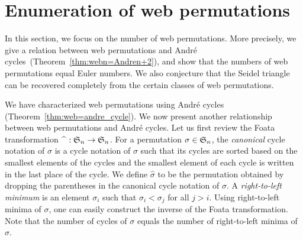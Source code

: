 \section{Enumeration of web permutations}
\label{sec:enumeration}
In this section, we focus on the number of web permutations. 
More precisely, we give a relation between web permutations and
Andr\'e cycles~(Theorem~\ref{thm:webn=Andren+2}),
and show that the numbers of web permutations equal Euler numbers.
We also conjecture that the Seidel triangle can be recovered completely from
the certain classes of web permutations.

We have characterized web permutations using Andr\'e cycles (Theorem~\ref{thm:web=andre_cycle}).
We now present another relationship between web permutations and Andr\'e cycles.
Let us first review the Foata transformation \( \widehat{~~}:\mathfrak{S}_n\rightarrow\mathfrak{S}_n \).
For a permutation $\sigma\in\mathfrak{S}_n$, the \emph{canonical} cycle notation
of \( \sigma \) is a cycle notation of \( \sigma \) such that its cycles are
sorted based on the smallest elements of the cycles and
the smallest element of each cycle is written in the last place of the cycle.
We define \( \widehat{\sigma} \) to be the permutation obtained by dropping 
the parentheses in the canonical cycle notation of \( \sigma \).
A \emph{right-to-left minimum} is an element \( \sigma_i \) such that
\( \sigma_i < \sigma_j \) for all \( j>i \).
Using right-to-left minima of \( \sigma \), one can easily construct the inverse
of the Foata transformation.
Note that the number of cycles of \( \sigma \) equals the number of right-to-left minima of \( \widehat{\sigma} \).

